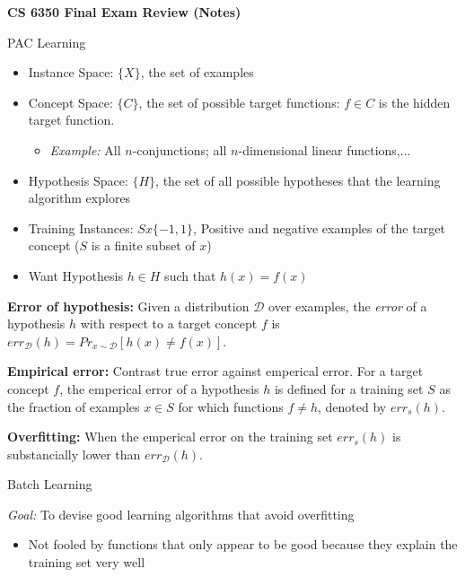 \documentclass{article}
\begin{document}
\begin{center}
{\huge \bf CS 6350 Final Exam Review (Notes)}
\end{center}

{\large PAC Learning}
\begin{itemize}
\item Instance Space: $\{X\}$, the set of examples
\item Concept Space: $\{C\}$, the set of possible target functions: $f\in C$ is the hidden target function.
\begin{itemize}
\item {\em Example:} All $n$-conjunctions; all $n$-dimensional linear functions,...
\end{itemize}
\item Hypothesis Space: $\{H\}$, the set of all possible hypotheses that the learning algorithm explores
\item Training Instances: $Sx\{-1,1\}$, Positive and negative examples of the target concept ($S$ is a finite subset of $x$)
\item Want Hypothesis $h\in H$ such that $h(x)=f(x)$
\end{itemize}

{\bf Error of hypothesis:} Given a distribution $\mathcal{D}$ over examples, the {\em error} of a hypothesis $h$ with respect to a target concept $f$ is $err_{\mathcal{D}}(h) = Pr_{x\sim\mathcal{D}}\left[h(x)\neq f(x)\right]$.

{\bf Empirical error:} Contrast true error against emperical error. For a target concept $f$, the emperical error of a hypothesis $h$ is defined for a training set $S$ as the fraction of examples $x\in S$ for which functions $f\neq h$, denoted by $err_{s}(h)$.

{\bf Overfitting:} When the emperical error on the training set $err_{s}(h)$ is substancially lower than $err_{\mathcal{D}}(h)$.

{\large Batch Learning}

{\em Goal:} To devise good learning algorithms that avoid overfitting
\begin{itemize}
\item Not fooled by functions that only appear to be good because they explain the training set very well
\end{itemize}
\end{document}
